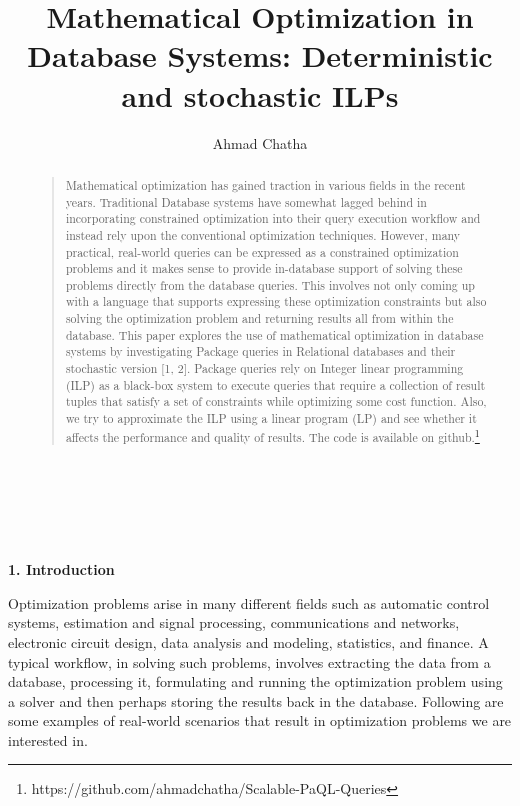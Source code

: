 \documentclass[a4paper,12pt]{article}
\title{Mathematical Optimization in Database Systems: Deterministic and stochastic ILPs}
\author{Ahmad Chatha}
\begin{document}
\maketitle

\begin{abstract}
\begin{quote}
Mathematical optimization has gained traction in various fields in the recent years. Traditional Database systems have somewhat lagged behind in incorporating constrained optimization into their query execution workflow and instead rely upon the conventional optimization techniques. However, many practical, real-world queries can be expressed as a constrained optimization problems and it makes sense to provide in-database support of solving these problems directly from the database queries. This involves not only coming up with a language that supports expressing these optimization constraints but also solving the optimization problem and returning results all from within the database. This paper explores the use of mathematical optimization in database systems by investigating Package queries in Relational databases and their stochastic version [1, 2]. Package queries rely on Integer linear programming (ILP) as a black-box system to execute queries that require a collection of result tuples that satisfy a set of constraints while optimizing some cost function. Also, we try to approximate the ILP using a linear program (LP) and see whether it affects the performance and quality of results. The code is available on github.\footnote{https://github.com/ahmadchatha/Scalable-PaQL-Queries}
\end{quote}
\end{abstract}
\vspace{5mm}
\\

\\\\
{\large\textbf{1. Introduction}}
\vspace{5mm}

Optimization problems arise in many different fields such as automatic control systems, estimation and signal processing, communications and networks, electronic circuit design, data analysis and modeling,
statistics, and finance. A typical workflow, in solving such problems, involves extracting the data from a database, processing it, formulating and running the optimization problem using a solver and then perhaps storing the results back in the database. Following are some examples of real-world scenarios that result in optimization problems we are interested in.
\\
\end{document}
